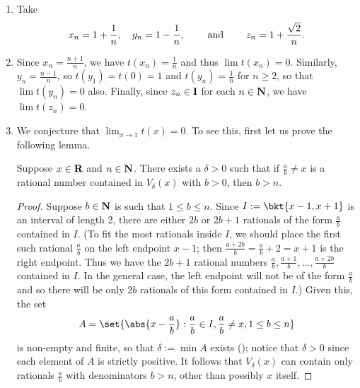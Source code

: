 \documentclass{lew98_solutions}
\begin{document}
\begin{solution}
    \begin{enumerate}
        \item Take
        \[
            x_n = 1 + \frac{1}{n}, \quad y_n = 1 - \frac{1}{n}, \hspace{8mm} \text{and} \hspace{8mm} z_n = 1 + \frac{\sqrt{2}}{n}.
        \]

        \item Since \( x_n = \tfrac{n+1}{n} \), we have \( t(x_n) = \tfrac{1}{n} \) and thus \( \lim t(x_n) = 0 \). Similarly, \( y_n = \tfrac{n-1}{n} \), so \( t(y_1) = t(0) = 1 \) and \( t(y_n) = \tfrac{1}{n} \) for \( n \geq 2 \), so that \( \lim t(y_n) = 0 \) also. Finally, since \( z_n \in \mathbf{I} \) for each \( n \in \mathbf{N} \), we have \( \lim t(z_n) = 0 \).

        \item We conjecture that \( \lim_{x \to 1} t(x) = 0 \). To see this, first let us prove the following lemma.

        \begin{lemma}
        \label{lem:ex4.2.3}
            Suppose \( x \in \mathbf{R} \) and \( n \in \mathbf{N} \). There exists a \( \delta > 0 \) such that if \( \tfrac{a}{b} \neq x \) is a rational number contained in \( V_{\delta}(x) \) with \( b > 0 \), then \( b > n \).

        \end{lemma}
        \begin{proof}
            Suppose \( b \in \mathbf{N} \) is such that \( 1 \leq b \leq n \). Since \( I := \bkt{ x - 1, x + 1 } \) is an interval of length 2, there are either \( 2b \) or \( 2b + 1 \) rationals of the form \( \tfrac{a}{b} \) contained in \( I \). (To fit the most rationals inside \( I \), we should place the first such rational \( \tfrac{a}{b} \) on the left endpoint \( x - 1 \); then \( \tfrac{a + 2b}{b} = \tfrac{a}{b} + 2 = x + 1 \) is the right endpoint. Thus we have the \( 2b + 1 \) rational numbers \( \tfrac{a}{b}, \tfrac{a + 1}{b}, \ldots, \tfrac{a + 2b}{b} \) contained in \( I \). In the general case, the left endpoint will not be of the form \( \tfrac{a}{b} \) and so there will be only \( 2b \) rationals of this form contained in \( I \).) Given this, the set
            \[
                A = \set{ \abs{x - \frac{a}{b}} : \frac{a}{b} \in I, \frac{a}{b} \neq x, 1 \leq b \leq n }
            \]
            is non-empty and finite, so that \( \delta := \min A \) exists (); notice that \( \delta > 0 \) since each element of \( A \) is strictly positive. It follows that \( V_{\delta}(x) \) can contain only rationals \( \tfrac{a}{b} \) with denominators \( b > n \), other than possibly \( x \) itself.
        \end{proof}


\end{enumerate}
\end{solution}
\end{document}
